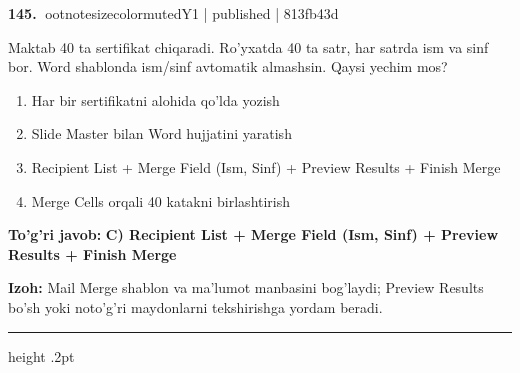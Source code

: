 \documentclass[10pt,a4paper]{article}
\begin{document}
\textbf{\color{ink}145.} {ootnotesizecolor{muted}Y1 | published | 813fb43d}
\par
Maktab 40 ta sertifikat chiqaradi. Ro'yxatda 40 ta satr, har satrda ism va sinf bor. Word shablonda ism/sinf avtomatik almashsin. Qaysi yechim mos?
\begin{enumerate}[label=\Alph*),leftmargin=9mm]
\item Har bir sertifikatni alohida qo'lda yozish
\item Slide Master bilan Word hujjatini yaratish
\item Recipient List + Merge Field (Ism, Sinf) + Preview Results + Finish Merge
\item Merge Cells orqali 40 katakni birlashtirish
\end{enumerate}
\begin{tcolorbox}[enhanced,breakable,colback=teal!4,colframe=teal!55!black,boxrule=0.45pt,arc=1.2mm,left=2.8mm,right=2.8mm,top=2mm,bottom=2mm]
\textbf{\color{teal}To'g'ri javob:} \textbf{C) Recipient List + Merge Field (Ism, Sinf) + Preview Results + Finish Merge}
\par\smallskip
\textbf{Izoh:} Mail Merge shablon va ma'lumot manbasini bog'laydi; Preview Results bo'sh yoki noto'g'ri maydonlarni tekshirishga yordam beradi.
\end{tcolorbox}
\vspace{2mm}\hrule height .2pt\vspace{2mm}
\end{document}
